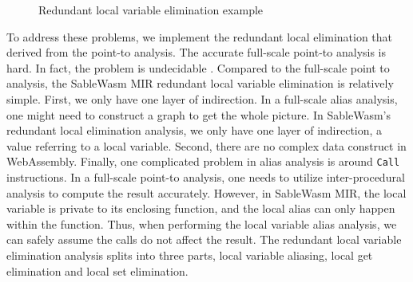 \begin{figure}
    
    \caption{Redundant local variable elimination example}
    \label{fig:redundant-local-elem}
\end{figure}

To address these problems, we implement the redundant local elimination that derived from the point-to analysis\cite{alias-sable, point-to-microsoft, point-to-survey}. The accurate full-scale point-to analysis is hard. In fact, the problem is undecidable \cite{point-to-undecidable}. Compared to the full-scale point to analysis, the SableWasm MIR redundant local variable elimination is relatively simple. First, we only have one layer of indirection. In a full-scale alias analysis, one might need to construct a graph to get the whole picture. In SableWasm's redundant local elimination analysis, we only have one layer of indirection, a value referring to a local variable. Second, there are no complex data construct in WebAssembly. Finally, one complicated problem in alias analysis is around \texttt{Call} instructions. In a full-scale point-to analysis, one needs to utilize inter-procedural analysis to compute the result accurately. However, in SableWasm MIR, the local variable is private to its enclosing function, and the local alias can only happen within the function. Thus, when performing the local variable alias analysis, we can safely assume the calls do not affect the result. The redundant local variable elimination analysis splits into three parts, local variable aliasing, local get elimination and local set elimination.

